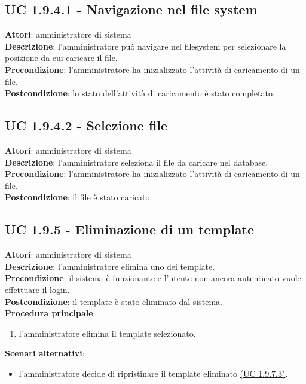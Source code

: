 \subsection{UC 1.9.4.1 - Navigazione nel file system}{
	\label{uc1.9.4.1}
	\textbf{Attori}: amministratore di sistema \\
	\textbf{Descrizione}: l'amministratore può navigare nel filesystem per selezionare la posizione da cui caricare il file. \\
	\textbf{Precondizione}: l'amministratore ha inizializzato l’attività di caricamento di un file.	\\
	\textbf{Postcondizione}: lo stato dell’attività di caricamento è stato completato.	\\
	}
\subsection{UC 1.9.4.2 - Selezione file}{
	\label{uc1.9.4.2}
	\textbf{Attori}: amministratore di sistema \\
	\textbf{Descrizione}: l'amministratore seleziona il file da caricare nel database. \\
	\textbf{Precondizione}: l'amministratore ha inizializzato l’attività di caricamento di un file.	\\
	\textbf{Postcondizione}: il file è stato caricato.	\\
	}
\subsection{UC 1.9.5 - Eliminazione di un template}{
	\label{uc1.9.5}
	\textbf{Attori}: amministratore di sistema \\
	\textbf{Descrizione}: l'amministratore elimina uno dei template. \\
	\textbf{Precondizione}: il sistema è funzionante e l’utente non ancora autenticato vuole effettuare il login.	\\
	\textbf{Postcondizione}: il template è stato eliminato dal sistema.	\\
	\textbf{Procedura principale}:
	\begin{enumerate}
		\item l’amministratore elimina il template selezionato.
	\end{enumerate}
	\textbf{Scenari alternativi}:
	\begin{itemize}
		\item l'amministratore decide di ripristinare il template eliminato \hyperref[uc1.9.7.3]{(UC 1.9.7.3)}.
	\end{itemize}
	}
